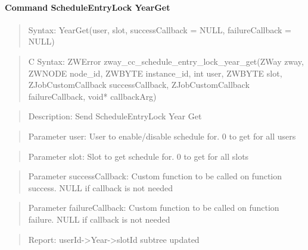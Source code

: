 \paragraph{Command ScheduleEntryLock YearGet}
\begin{quote}Syntax: YearGet(user, slot, successCallback = NULL, failureCallback = NULL)\end{quote}
\begin{quote}C Syntax: ZWError zway\_cc\_schedule\_entry\_lock\_year\_get(ZWay zway, ZWNODE node\_id, ZWBYTE instance\_id, int user, ZWBYTE slot, ZJobCustomCallback successCallback, ZJobCustomCallback failureCallback, void* callbackArg)\end{quote}
\begin{quote}Description: Send ScheduleEntryLock Year Get\end{quote}
\begin{quote}Parameter user: User to enable/disable schedule for. 0 to get for all users\end{quote}
\begin{quote}Parameter slot: Slot to get schedule for. 0 to get for all slots\end{quote}
\begin{quote}Parameter successCallback: Custom function to be called on function success. NULL if callback is not needed\end{quote}
\begin{quote}Parameter failureCallback: Custom function to be called on function failure. NULL if callback is not needed\end{quote}
\begin{quote}Report: userId->Year->slotId subtree updated\end{quote}

